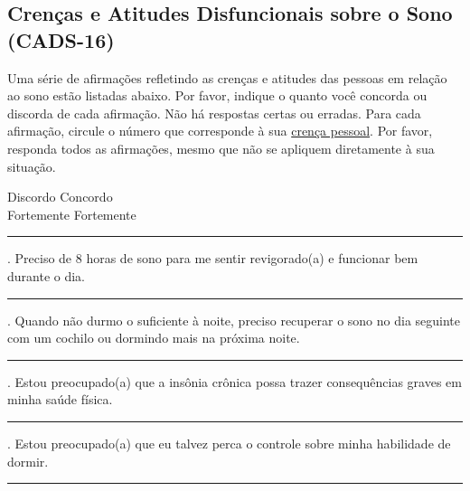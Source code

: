 \documentclass[
  ,doc,11pt, twoside,floatsintext]{apa6}
\begin{document}
\begin{appendix}
\section{Crenças e Atitudes Disfuncionais sobre o Sono (CADS-16)}
\label{cads-16}

Uma série de afirmações refletindo as crenças e atitudes das pessoas em relação ao sono estão listadas abaixo. Por favor, indique o quanto você concorda ou discorda de cada afirmação. Não há respostas certas ou erradas. Para cada afirmação, circule o número que corresponde à sua \underline{crença pessoal}. Por favor, responda todos as afirmações, mesmo que não se apliquem diretamente à sua situação.
\smallskip

\begin{flushleft}

{
\begin{center}
Discordo \hfill Concordo\\
Fortemente \hfill Fortemente
\end{center}

\medskip
\hrule
\medskip

\hspace*{6mm} \par

. Preciso de 8 horas de sono para me sentir revigorado(a) e funcionar bem durante o dia.
\medskip
\hrule
\medskip
\hspace*{6mm} \par


. Quando não durmo o suficiente à noite, preciso recuperar o sono no dia seguinte com um cochilo ou dormindo mais na próxima noite.
\medskip
\hrule
\medskip
\hspace*{6mm} \par

. Estou preocupado(a) que a insônia crônica possa trazer consequências graves em minha saúde física. 
\medskip
\hrule
\medskip
\hspace*{6mm} \par

. Estou preocupado(a) que eu talvez perca o controle sobre minha habilidade de dormir.
\medskip
\hrule
\medskip
\hspace*{6mm} \par

}
\end{flushleft}
\end{appendix}
\end{document}
